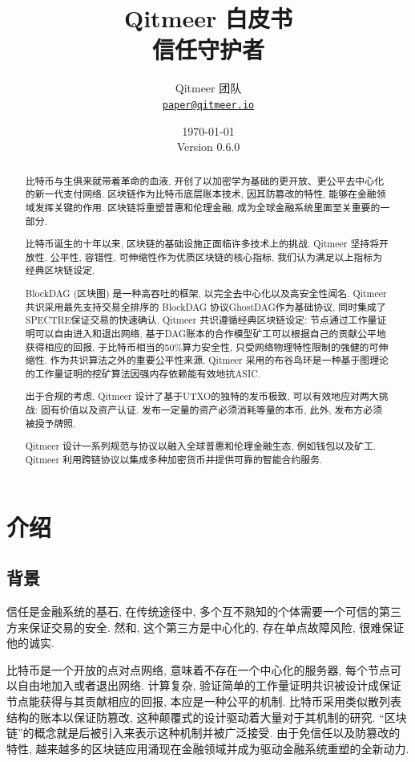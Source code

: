 \documentclass[a4paper,11pt]{article}
\title{\LARGE Qitmeer 白皮书\\
	\Large 信任守护者}
\author{
	Qitmeer 团队\\
		\small\href{mailto:paper@qitmeer.io}
			{\nolinkurl{paper@qitmeer.io}}
	}
\date{\today\\\small Version 0.6.0}
\newcommand{\watermark}[3]{\AddToShipoutPictureBG{
	\parbox[b][\paperheight]{\paperwidth}{
		\vfill%
		\centering%
	\tikz[remember picture, overlay]%
	  \node [rotate = #1, scale = #2] at (current page.center)%
	      {\textcolor{gray!80!cyan!30}{#3}};
	  \vfill}}}
\begin{document}
\clearpage
\pagestyle{plain}

\maketitle


\begin{abstract}
比特币\cite{bitcoin}与生俱来就带着革命的血液, 开创了以加密学为基础的更开放、更公平去中心化的新一代支付网络. 区块链作为比特币底层账本技术, 因其防篡改的特性, 能够在金融领域发挥关键的作用. 区块链将重塑普惠和伦理金融, 成为全球金融系统里面至关重要的一部分.

比特币诞生的十年以来, 区块链的基础设施正面临许多技术上的挑战. Qitmeer 坚持将开放性, 公平性, 容错性, 可伸缩性作为优质区块链的核心指标, 我们认为满足以上指标为经典区块链设定.

BlockDAG (区块图) 是一种高吞吐的框架, 以完全去中心化以及高安全性闻名. Qitmeer共识采用最先支持交易全排序的 BlockDAG 协议GhostDAG作为基础协议, 同时集成了SPECTRE保证交易的快速确认. Qitmeer 共识遵循经典区块链设定: 节点通过工作量证明可以自由进入和退出网络, 基于DAG账本的合作模型矿工可以根据自己的贡献公平地获得相应的回报, 于比特币相当的50\%算力安全性, 只受网络物理特性限制的强健的可伸缩性. 作为共识算法之外的重要公平性来源, Qitmeer 采用的布谷鸟环是一种基于图理论的工作量证明的挖矿算法因强内存依赖能有效地抗ASIC. 

出于合规的考虑, Qitmeer 设计了基于UTXO的独特的发币极致, 可以有效地应对两大挑战: 固有价值以及资产认证. 发布一定量的资产必须消耗等量的本币, 此外, 发布方必须被授予牌照.

Qitmeer 设计一系列规范与协议以融入全球普惠和伦理金融生态, 例如钱包以及矿工. Qitmeer 利用跨链协议以集成多种加密货币并提供可靠的智能合约服务.

\end{abstract}

\section{介绍}

\subsection{背景}

信任是金融系统的基石, 在传统途径中, 多个互不熟知的个体需要一个可信的第三方来保证交易的安全. 然和, 这个第三方是中心化的, 存在单点故障风险, 很难保证他的诚实.


比特币是一个开放的点对点网络, 意味着不存在一个中心化的服务器, 每个节点可以自由地加入或者退出网络. 计算复杂, 验证简单的工作量证明共识被设计成保证节点能获得与其贡献相应的回报, 本应是一种公平的机制. 比特币采用类似散列表结构的账本以保证防篡改, 这种颠覆式的设计驱动着大量对于其机制的研究. “区块链”的概念就是后被引入来表示这种机制并被广泛接受. 由于免信任以及防篡改的特性, 越来越多的区块链应用涌现在金融领域并成为驱动金融系统重塑的全新动力.
\end{document}
